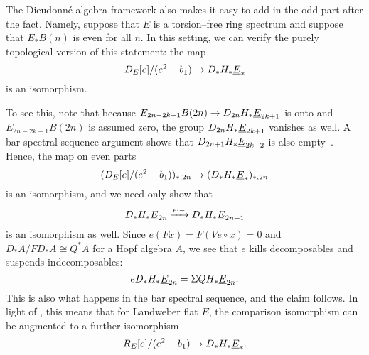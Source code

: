 \begin{remark}
The Dieudonn\'e algebra framework also makes it easy to add in the odd part after the fact.  Namely, suppose that $E$ is a torsion--free ring spectrum and suppose that $E_* B(n)$ is even for all $n$.  In this setting, we can verify the purely topological version of this statement: the map \[D_E[e] / (e^2 - b_1) \to D_* H_* \underline{\smash{E}}_{*}\] is an isomorphism.

To see this, note that because $E_{2n-2k-1} B(2n) \to D_{2n} H_* \underline{\smash{E}}_{2k+1}$ is onto and $E_{2n-2k-1} B(2n)$ is assumed zero, the group $D_{2n} H_* \underline{\smash{E}}_{2k+1}$ vanishes as well.  A bar spectral sequence argument shows that $D_{2n+1} H_* \underline{\smash{E}}_{2k+2}$ is also empty~\cite[Lemma 11.5.1]{GoerssDieudonne}.  Hence, the map on even parts \[(D_E[e] / (e^2 - b_1))_{*, 2n} \to (D_* H_* \underline{\smash{E}}_{*})_{*, 2n}\] is an isomorphism, and we need only show that \[D_* H_* \underline{\smash{E}}_{2n} \xrightarrow{e \cdot -} D_* H_* \underline{\smash{E}}_{2n+1}\] is an isomorphism as well.  Since $e(Fx) = F(Ve \circ x) = 0$ and $D_* A / FD_* A \cong Q^* A$ for a Hopf algebra $A$, we see that $e$ kills decomposables and suspends indecomposables: \[e D_* H_* \underline{\smash{E}}_{2n} = \Sigma QH_* \underline{\smash{E}}_{2n}.\]  This is also what happens in the bar spectral sequence, and the claim follows.  In light of , this means that for Landweber flat $E$, the comparison isomorphism can be augmented to a further isomorphism \[R_E[e] / (e^2 - b_1) \to D_* H_* \underline{\smash{E}}_{*}.\]
\end{remark}







